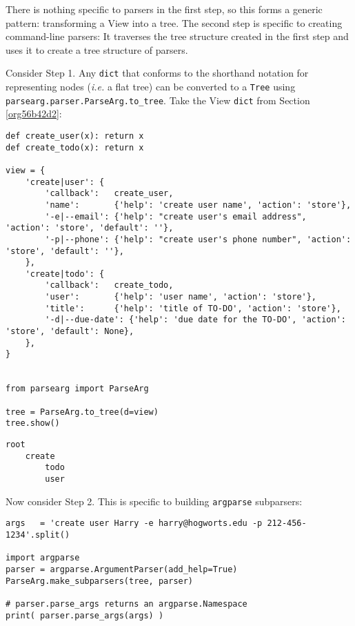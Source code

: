 \documentclass[10pt]{amsart}
\numberwithin{equation}{section}
\begin{document}
There is nothing specific to parsers in the first step, so this 
forms a generic pattern: transforming a View into a tree. 
The second step is specific to creating command-line parsers: 
It traverses the tree structure created in the first step
and uses it to create a tree structure of parsers. 

Consider Step 1. Any \texttt{dict} that conforms to the shorthand notation for 
representing nodes (\emph{i.e.} a flat tree) can be converted
to a \texttt{Tree} using \texttt{parsearg.parser.ParseArg.to\_tree}. Take
the View \texttt{dict} from Section \ref{org56b42d2}:
\begin{verbatim}
def create_user(x): return x
def create_todo(x): return x

view = {
    'create|user': {
        'callback':   create_user,
        'name':       {'help': 'create user name', 'action': 'store'},
        '-e|--email': {'help': "create user's email address", 'action': 'store', 'default': ''},
        '-p|--phone': {'help': "create user's phone number", 'action': 'store', 'default': ''},
    },
    'create|todo': {
        'callback':   create_todo,
        'user':       {'help': 'user name', 'action': 'store'},
        'title':      {'help': 'title of TO-DO', 'action': 'store'},
        '-d|--due-date': {'help': 'due date for the TO-DO', 'action': 'store', 'default': None},
    },
}


from parsearg import ParseArg

tree = ParseArg.to_tree(d=view)
tree.show()
\end{verbatim}

\begin{verbatim}
root
    create
        todo
        user
\end{verbatim}



Now consider Step 2. This is specific to building \texttt{argparse} subparsers:
\begin{verbatim}
args   = 'create user Harry -e harry@hogworts.edu -p 212-456-1234'.split()

import argparse
parser = argparse.ArgumentParser(add_help=True)
ParseArg.make_subparsers(tree, parser)

# parser.parse_args returns an argparse.Namespace
print( parser.parse_args(args) )
\end{verbatim}
\end{document}
